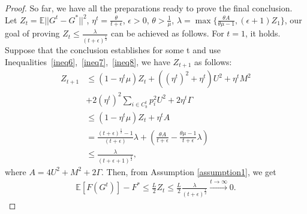 \begin{proof}
So far, we have all the preparations ready to prove the final conclusion. Let  $Z_t=\mathbb{E}||G^t-G^*||^2$, $\eta^t=\frac{\theta}{t+\epsilon}$, $\epsilon>0$, $\theta > \frac{1}{\mu}$, $\lambda=\max\{\frac{\theta A}{\theta \mu -1}, (\epsilon+1)Z_1\}$, our goal of proving $Z_t \leq \frac{\lambda}{(t+\epsilon)^{\frac{1}{2}}}$ can be achieved as follows.
\newline
For $t=1$, it holds. Suppose that the conclusion establishes for some t and use Inequalities~\ref{ineq6},~\ref{ineq7},~\ref{ineq8}, we have $Z_{t+1}$ as follows: %
\begin{equation}
    \begin{split}
        Z_{t+1}
	& \leq (1-\eta^t\mu) Z_{t}+((\eta^t)^2+\eta^t)U^2 + \eta^t M^2 \\
        &  + 2 (\eta^t)^2 \sum\limits_{i \in C_b^t}p_i^2 U^2+2\eta^t \Gamma \\
	& \leq (1-\eta^t\mu)Z_{t} + \eta^t A \\
	& = \frac{(t+\epsilon)^{\frac{1}{2}}-1}{(t+\epsilon)}\lambda+(\frac{\theta A}{t+\epsilon}-\frac{\theta \mu -1}{t+\epsilon}\lambda) \\
	& \leq \frac{\lambda}{(t+\epsilon +1)^{\frac{1}{2}}},
    \end{split}
\end{equation}
where $A=4U^2+M^2+2\Gamma$.
Then, from Assumption \ref{assumption1}, we get
\begin{equation}
    \begin{split}
        \mathbb{E}[F(G^t)]-F^*
	\leq \frac{L}{2} Z_t 
	\leq \frac{L}{2}\frac{\lambda}{(t+\epsilon )^{\frac{1}{2}}}
	\stackrel{t \to \infty}{\longrightarrow}0.
    \end{split}
\end{equation}
\end{proof}










